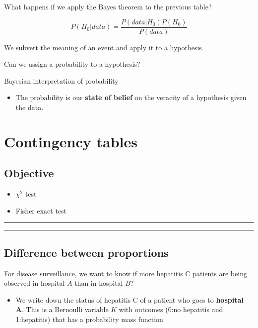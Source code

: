 \documentclass[
]{book}
\providecommand{\tightlist}{%
  \setlength{\itemsep}{0pt}\setlength{\parskip}{0pt}}
\begin{document}
What happens if we apply the Bayes theorem to the previous table?

\[P(H_0|data)=\frac{P(data|H_0)P(H_0)}{P(data)}\]

We subvert the meaning of an event and apply it to a hypothesis.

Can we assign a probability to a hypothesis?

Bayesian interpretation of probability

\begin{itemize}
\tightlist
\item
  The probability is our \textbf{state of belief} on the veracity of a hypothesis given the data.
\end{itemize}

\hypertarget{contingency-tables-1}{%
\chapter{Contingency tables}\label{contingency-tables-1}}

\hypertarget{objective-14}{%
\section{Objective}\label{objective-14}}

\begin{itemize}
\tightlist
\item
  \(\chi^2\) test
\item
  Fisher exact test
\end{itemize}

\begin{center}\rule{0.5\linewidth}{0.5pt}\end{center}

\begin{center}\rule{0.5\linewidth}{0.5pt}\end{center}

\hypertarget{difference-between-proportions}{%
\section{Difference between proportions}\label{difference-between-proportions}}

For disease surveillance, we want to know if more hepatitis C patients are being observed in hospital \(A\) than in hospital \(B\)?

\begin{itemize}
\tightlist
\item
  We write down the status of hepatitis C of a patient who goes to \textbf{hospital A}. This is a Bernoulli variable \(K\) with outcomes (0:no hepatitis and 1:hepatitis) that has a probability mass function
\end{itemize}
\end{document}
